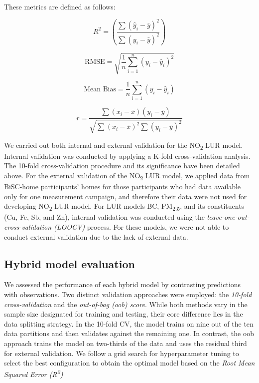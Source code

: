 \documentclass{article}
\begin{document}
These metrics are defined as follows:

\begin{equation}
R^2 = \left( \frac{\sum (\hat{y}_i - \bar{y})^2}{\sum (y_i - \bar{y})^2} \right)
\end{equation}

\begin{equation}
\text{RMSE} = \sqrt{\frac{1}{n} \sum_{i=1}^{n} (y_i - \hat{y}_i)^2}
\end{equation}

\begin{equation}
\text{Mean Bias} = \frac{1}{n} \sum_{i=1}^{n} (y_i - \hat{y}_i)
\end{equation}

\begin{equation}
r = \frac{\sum (x_i - \bar{x})(y_i - \bar{y})}{\sqrt{\sum (x_i - \bar{x})^2 \sum (y_i - \bar{y})^2}}
\end{equation}
\vspace{0.5 cm}

We carried out both internal and external validation for the NO\textsubscript{2} LUR model. Internal validation was conducted by applying a K-fold cross-validation analysis. The 10-fold cross-validation procedure and its significance have been detailed above. For the external validation of the NO\textsubscript{2} LUR model, we applied data from BiSC-home participants' homes for those participants who had data available only for one measurement campaign, and therefore their data were not used for developing NO\textsubscript{2} LUR model. For LUR models BC, PM\textsubscript{2.5}, and its constituents (Cu, Fe, Sb, and Zn), internal validation was conducted using the \textit{leave-one-out-cross-validation (LOOCV)} process. For these models, we were not able to conduct external validation due to the lack of external data.

\subsection{Hybrid model evaluation}
We assessed the performance of each hybrid model by contrasting predictions with observations. Two distinct validation approaches were employed: the \textit{10-fold cross-validation} and the \textit{out-of-bag (oob) score}. While both methods vary in the sample size designated for training and testing, their core difference lies in the data splitting strategy. In the 10-fold CV, the model trains on nine out of the ten data partitions and then validates against the remaining one. In contrast, the oob approach trains the model on two-thirds of the data and uses the residual third for external validation. We follow a grid search for hyperparameter tuning  to select the best configuration to obtain the optimal model based on the \textit{Root Mean Squared Error (R\textsuperscript{2})}
\end{document}
